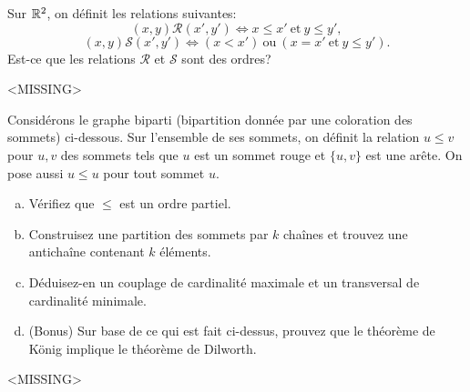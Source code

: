 
\begin{exo}
Sur $\mathbb{R}^2$, on d\'efinit les relations suivantes:
\[(x,y)\mathcal{R}(x',y') \Leftrightarrow x \leq x' \mathrm{~et~} y \leq y', \]
\[(x,y)\mathcal{S}(x',y') \Leftrightarrow (x < x') \mathrm{~ou~} (x = x' \mathrm{~et~} y \leq y').\]
Est-ce que les relations $\mathcal{R}$ et $\mathcal{S}$ sont des ordres?
\end{exo}

<MISSING>


\begin{exo}
Consid\'erons le graphe biparti (bipartition donn\'ee par une coloration des sommets) ci-dessous. Sur l'ensemble de ses sommets, on d\'efinit la relation $u\leq v$ pour $u,v$ des sommets tels que $u$ est un sommet rouge et $\{u,v\}$ est une ar\^ete. On pose aussi $u\leq u$ pour tout sommet $u$. \\
\begin{enumerate}[(a)]
\item V\'erifiez que $\leq$ est un ordre partiel.
\item Construisez une partition des sommets par $k$ cha\^ines et trouvez une anticha\^ine contenant $k$ \'el\'ements.
\item D\'eduisez-en un couplage de cardinalit\'e maximale et un transversal de cardinalit\'e minimale. 
\item (Bonus) Sur base de ce qui est fait ci-dessus, prouvez que le th\'eor\`eme de K\"onig implique le th\'eor\`eme de Dilworth.
\end{enumerate}
\end{exo}

\begin{figure}[!h]
\begin{center}

\end{center}
\caption{}
\end{figure}

<MISSING>

